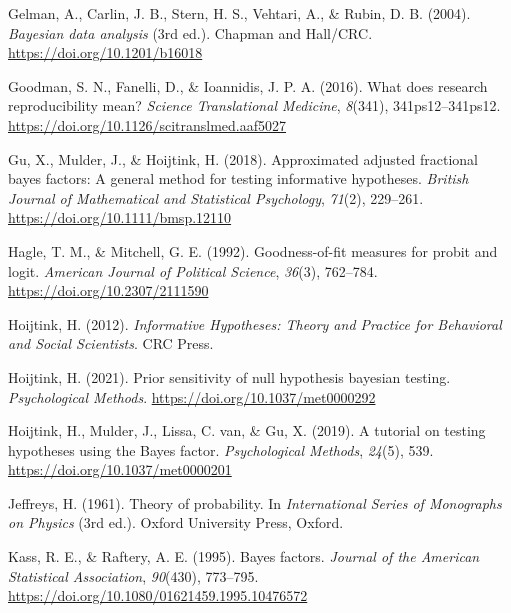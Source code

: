 \documentclass[
]{interact}
\newlength{\cslhangindent}
\newlength{\cslentryspacingunit} %
\newenvironment{CSLReferences}[2] %
 {%
  \setlength{\parindent}{0pt}
  \ifodd #1
  \let\oldpar\par
  \def\par{\hangindent=\cslhangindent\oldpar}
  \fi
  \setlength{\parskip}{#2\cslentryspacingunit}
 }%
 {}
\begin{document}
\begin{CSLReferences}{1}{0}
\leavevmode{}%
Gelman, A., Carlin, J. B., Stern, H. S., Vehtari, A., \& Rubin, D. B.
(2004). \emph{Bayesian data analysis} (3rd ed.). {Chapman and Hall/CRC}.
\url{https://doi.org/10.1201/b16018}

\leavevmode{}%
Goodman, S. N., Fanelli, D., \& Ioannidis, J. P. A. (2016). What does
research reproducibility mean? \emph{Science Translational Medicine},
\emph{8}(341), 341ps12--341ps12.
\url{https://doi.org/10.1126/scitranslmed.aaf5027}

\leavevmode{}%
Gu, X., Mulder, J., \& Hoijtink, H. (2018). Approximated adjusted
fractional bayes factors: A general method for testing informative
hypotheses. \emph{British Journal of Mathematical and Statistical
Psychology}, \emph{71}(2), 229--261.
\url{https://doi.org/10.1111/bmsp.12110}

\leavevmode{}%
Hagle, T. M., \& Mitchell, G. E. (1992). Goodness-of-fit measures for
probit and logit. \emph{American Journal of Political Science},
\emph{36}(3), 762--784. \url{https://doi.org/10.2307/2111590}

\leavevmode{}%
Hoijtink, H. (2012). \emph{Informative {H}ypotheses: {T}heory and
{P}ractice for {B}ehavioral and {S}ocial {S}cientists}. CRC Press.

\leavevmode{}%
Hoijtink, H. (2021). Prior sensitivity of null hypothesis bayesian
testing. \emph{Psychological Methods}.
\url{https://doi.org/10.1037/met0000292}

\leavevmode{}%
Hoijtink, H., Mulder, J., Lissa, C. van, \& Gu, X. (2019). A tutorial on
testing hypotheses using the {B}ayes factor. \emph{Psychological
Methods}, \emph{24}(5), 539. \url{https://doi.org/10.1037/met0000201}

\leavevmode{}%
Jeffreys, H. (1961). {Theory of probability}. In \emph{{International
Series of Monographs on Physics}} (3rd ed.). Oxford University Press,
Oxford.

\leavevmode{}%
Kass, R. E., \& Raftery, A. E. (1995). Bayes factors. \emph{Journal of
the American Statistical Association}, \emph{90}(430), 773--795.
\url{https://doi.org/10.1080/01621459.1995.10476572}


\end{CSLReferences}
\end{document}
